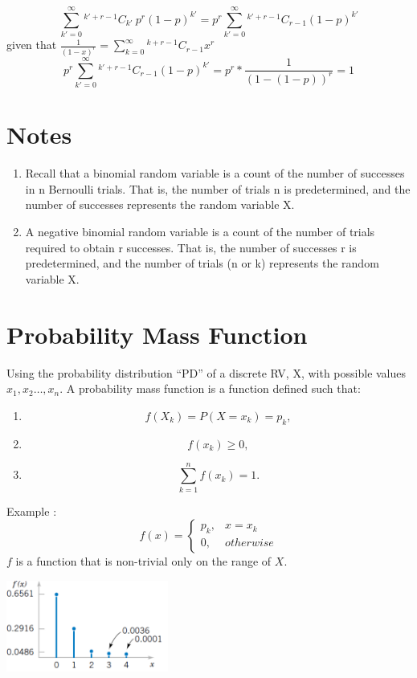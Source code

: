 \documentclass[12pt]{article}
\theoremstyle{definition}
\newcommand*{\Comb}[2]{{}^{#1}C_{#2}}%
\begin{document}
\begin{equation}
    \displaystyle \sum_{k' = 0}^{\infty} \Comb{k' + r -1}{k'} \ p^r (1-p)^{k'} =
    p^r \sum_{k'= 0}^{\infty}  \Comb{k' + r-1}{r-1}(1-p)^{k'}
\end{equation}
given that $ \displaystyle \frac{1}{(1-x)^r} = \sum_{k=0}^{\infty} \Comb{k+r-1}{r-1}x^r $
\begin{equation}
    \displaystyle p^r \sum_{k'= 0}^{\infty}  \Comb{k' + r-1}{r-1}(1-p)^{k'} = p^r * \frac{1}{(1-(1-p))^r} = 1 
\end{equation}
\section{Notes}
\begin{enumerate}
    \item Recall that a binomial random variable is a count of the number
        of successes in n Bernoulli trials. That is, the number of trials n is
        predetermined, and the number of successes represents the random variable X.
    \item  A negative binomial random variable is a count of the number of
        trials required to obtain r successes. That is, the number of
        successes r is predetermined, and the number of trials (n or k)
        represents the random variable X.
\end{enumerate}    

\section{Probability Mass Function}
Using the probability distribution “PD” of a discrete RV,
X, with possible values $x_1, x_2\dots, x_n.$ A probability mass function is a function defined such that:
\begin{enumerate}
    \item \[    f(X_k) = P(X = x_k) = p_k,  \]
    \item \[          f(x_k) \geq 0,  \]
    \item \[  \displaystyle \sum_{k=1}^{n} f(x_k) = 1.       \]
\end{enumerate}
Example :\[ f(x)= \begin{cases} 
    p_k, & x=x_k \\
    0, & otherwise
\end{cases}
\] $f$ is a function that is non-trivial only on the range of $X$.

\begin{center}
    \includegraphics[width=201px]{2.png}
\end{center}
\end{document}
